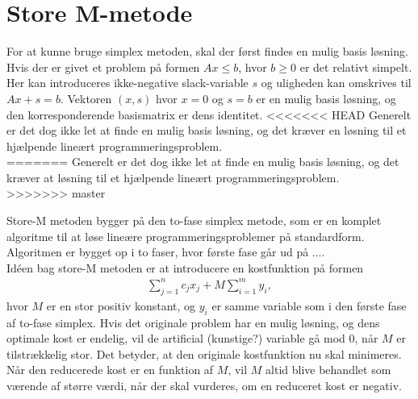 \section{Store M-metode}

For at kunne bruge simplex metoden, skal der først findes en mulig basis løsning. 
Hvis der er givet et problem på formen $Ax \leq b$, hvor $b \geq 0$ er det relativt simpelt. 
Her kan introduceres ikke-negative slack-variable $s$ og uligheden kan omskrives til $Ax+s=b$. 
Vektoren $(x,s)$ hvor $x=0$ og $s=b$ er en mulig basis løsning, og den korresponderende basismatrix er dens identitet. 
<<<<<<< HEAD
Generelt er det dog ikke let at finde en mulig basis løsning, og det kræver en løsning til et hjælpende lineært programmeringsproblem. \\
=======
Generelt er det dog ikke let at finde en mulig basis løsning, og det kræver at løsning til et hjælpende lineært programmeringsproblem. \\
>>>>>>> master

Store-M metoden bygger på den to-fase simplex metode, som er en komplet algoritme til at løse lineære programmeringsproblemer på standardform. 
Algoritmen er bygget op i to faser, hvor første fase går ud på .... \\

Idéen bag store-M metoden er at introducere en kostfunktion på formen
\begin{align*}
\sum\limits_{j=1}^n c_jx_j + M \sum\limits_{i=1}^m y_i,
\end{align*}
hvor $M$ er en stor positiv konstant, og $y_i$ er samme variable som i den første fase af to-fase simplex. 
Hvis det originale problem har en mulig løsning, og dens optimale kost er endelig, vil de artificial (kunstige?) variable gå mod $0$, når $M$ er tilstrækkelig stor. 
Det betyder, at den originale kostfunktion nu skal minimeres. 
Når den reducerede kost er en funktion af $M$, vil $M$ altid blive behandlet som værende af større værdi, når der skal vurderes, om en reduceret kost er negativ. \\

